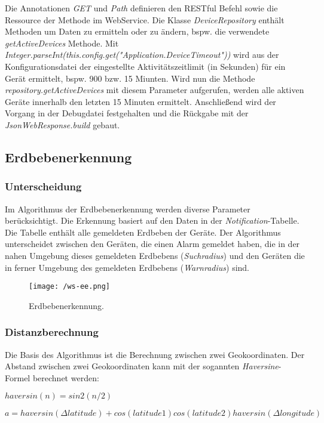 Die Annotationen \textit{GET} und \textit{Path} definieren den RESTful Befehl sowie die Ressource der Methode im WebService. Die Klasse \textit{DeviceRepository} enthält Methoden um Daten zu ermitteln oder zu ändern, bspw. die verwendete \textit{getActiveDevices} Methode. Mit \textit{Integer.parseInt(this.config.get("Application.DeviceTimeout"))} wird aus der Konfigurationsdatei der eingestellte Aktivitätszeitlimit (in Sekunden) für ein Gerät ermittelt, bspw. 900 bzw. 15 Miunten. Wird nun die Methode \textit{repository.getActiveDevices} mit diesem Parameter aufgerufen, werden alle aktiven Geräte innerhalb den letzten 15 Minuten ermittelt. Anschließend wird der Vorgang in der Debugdatei festgehalten und die Rückgabe mit der \textit{JsonWebResponse.build} gebaut.

\subsection{Erdbebenerkennung}
\subsubsection{Unterscheidung}
Im Algorithmus der Erdbebenerkennung werden diverse Parameter berücksichtigt. Die Erkennung basiert auf den Daten in der \textit{Notification}-Tabelle. Die Tabelle enthält alle gemeldeten Erdbeben der Geräte. Der Algorithmus unterscheidet zwischen den Geräten, die einen Alarm gemeldet haben, die in der nahen Umgebung dieses gemeldeten Erdbebens (\textit{Suchradius}) und den Geräten die in ferner Umgebung des gemeldeten Erdbebens (\textit{Warnradius}) sind.

\begin{figure}[H]
\centering
\texttt{[image: /ws-ee.png]}
\caption{Erdbebenerkennung.}
\label{fig:WSEE}
\end{figure}

\subsubsection{Distanzberechnung}
Die Basis des Algorithmus ist die Berechnung zwischen zwei Geokoordinaten. Der Abstand zwischen zwei Geokoordinaten kann mit der sogannten \textit{Haversine}-Formel berechnet werden:

\begin{math}haversin(n) = sin2(n/2)\end{math}

\begin{math}a = haversin(\Delta latitude) + cos(latitude1) cos(latitude2) haversin(\Delta longitude)\end{math}

